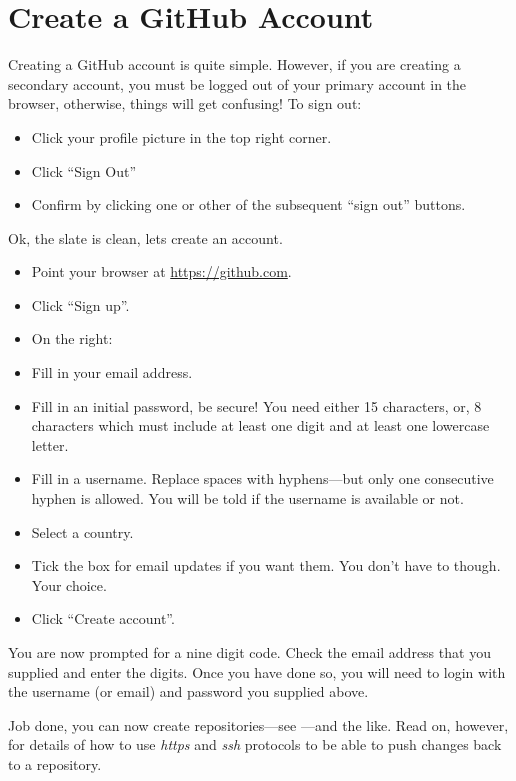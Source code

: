 \chapter{Create a GitHub Account}

Creating a GitHub account is quite simple. However, if you are creating a secondary account, you must be logged out of your primary account in the browser, otherwise, things will get confusing! To sign out:

\begin{itemize}
    \item Click your profile picture in the top right corner.
    \item Click ``Sign Out''
    \item Confirm by clicking one or other of the subsequent ``sign out'' buttons.
\end{itemize}

Ok, the slate is clean, lets create an account.

\begin{itemize}
    \item Point your browser at \url{https://github.com}.
    \item Click ``Sign up''.
    \item On the right:
    \item Fill in your email address.
    \item Fill in an initial password, be secure! You need either 15 characters, or, 8 characters which must include at least one digit and at least one lowercase letter.
    \item Fill in a username. Replace spaces with hyphens---but only one consecutive hyphen is allowed. You will be told if the username is available or not.
    \item Select a country.
    \item Tick the box for email updates if you want them. You don't have to though. Your choice.
    \item Click ``Create account''.
\end{itemize}

You are now prompted for a nine digit code. Check the email address that you supplied and enter the digits. Once you have done so, you will need to login with the username (or email) and password you supplied above.

Job done, you can now create repositories---see ---and the like. Read on, however, for details of how to use \emph{https} and \emph{ssh} protocols to be able to push changes back to a repository.
